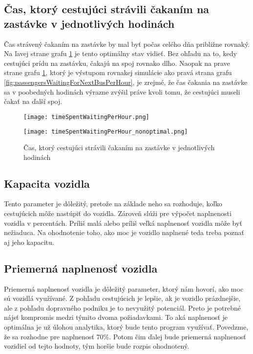 \subsection*{Čas, ktorý cestujúci strávili čakaním na zastávke v jednotlivých hodinách}
Čas strávený čakaním na zastávke by mal byť počas celého dňa približne rovnaký.
Na ľavej strane grafu \ref{fig:timeSpentWaitingPerHour} je tento optimálny stav vidieť.
Bez ohľadu na to, kedy cestujúci prídu na zastávku, čakajú na spoj rovnako dlho.
Naopak na prave strane grafu \ref{fig:timeSpentWaitingPerHour}, ktorý je výstupom rovnakej simulácie ako pravá strana grafu \ref{fig:passengersWaitingForNextBusPerHour}, je zrejmé, že čas čakania na zastávke sa v poobedných hodinách výrazne zvýšil práve kvoli tomu, že cestujúci museli čakať na ďalší spoj.
\begin{figure}[h]
  \label{fig:timeSpentWaitingPerHour}
  \centering
  \begin{minipage}{0.49\textwidth}
    \texttt{[image: timeSpentWaitingPerHour.png]}
  \end{minipage}
  \begin{minipage}{0.49\textwidth}
    \texttt{[image: timeSpentWaitingPerHour\_nonoptimal.png]}
  \end{minipage}
  \caption{Čas, ktorý cestujúci strávili čakaním na zastávke v jednotlivých hodinách}
\end{figure}

\subsection*{Kapacita vozidla}
Tento parameter je dôležitý, pretože na základe neho sa rozhoduje, koľko cestujúcich môže nastúpiť do vozidla.
Zároveň slúži pre výpočet naplnenosti vozidla v percentách.
Príliš malá alebo príliš veľká naplnenosť vozidla môže byť nežiaduca.
Na ohodnotenie toho, ako moc je vozidlo naplnené teda treba poznať aj jeho kapacitu.

\subsection*{Priemerná naplnenosť vozidla}
Priemerná naplnenosť vozidla je dôležitý parameter, ktorý nám hovorí, ako moc sú vozidlá využívané.
Z pohľadu cestujúcich je lepšie, ak je vozidlo prázdnejšie, ale z pohľadu dopravného podniku je to nevyužitý potenciál.
Preto je potrebné nájsť kompromis medzi týmito dvoma požiadavkami.
To aká naplnenosť je optimálna je už úlohou analytika, ktorý bude tento program využívať.
Povedzme, že sa rozhodne pre naplnenosť 70\%.
Potom čim ďalej bude priemerná naplnenosť vozidiel od tejto hodnoty, tým horšie bude rozpis ohodnotený.

